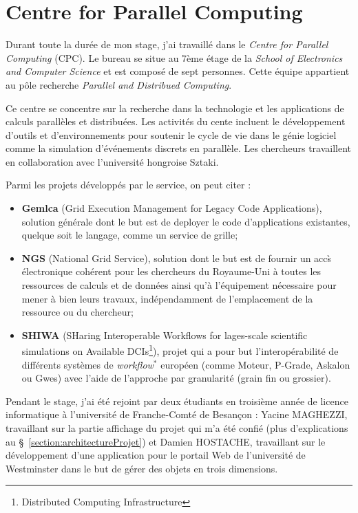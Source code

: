 \section{Centre for Parallel Computing}

Durant toute la dur\'ee de mon stage, j'ai travaill\'e dans le \textit{Centre for Parallel Computing} (CPC).
Le bureau se situe au 7\`eme \'etage de la \textit{School of Electronics and Computer Science} et est compos\'e de sept personnes.
Cette \'equipe appartient au p\^ole recherche \textit{Parallel and Distribued Computing}.

Ce centre se concentre sur la recherche dans la technologie et les applications de calculs parall\`eles et distribu\'ees.
Les activit\'es du cente incluent le d\'eveloppement d'outils et d'environnements pour soutenir le cycle de vie dans le g\'enie logiciel comme la simulation d'\'ev\'enements discrets en parall\`ele.
Les chercheurs travaillent en collaboration avec l'universit\'e hongroise Sztaki.

\noindent Parmi les projets d\'evelopp\'es par le service, on peut citer :

\begin{itemize}
	\item \textbf{Gemlca} (Grid Execution Management for Legacy Code Applications), solution g\'en\'erale dont le but est de deployer le code d'applications existantes, quelque soit le langage, comme un service de grille;
	\item \textbf{NGS} (National Grid Service), solution dont le but est de fournir un acc\`s \'electronique coh\'erent pour les chercheurs du Royaume-Uni \`a toutes les ressources de calculs et de donn\'ees ainsi qu'\`a l'\'equipement n\'ecessaire pour mener \`a bien leurs travaux, ind\'ependamment de l'emplacement de la ressource ou du chercheur;
	\item \textbf{SHIWA} (SHaring Interoperable Workflows for lages-scale scientific simulations on Available DCIs\protect\footnote{Distributed Computing Infrastructure}), projet qui a pour but l'interop\'erabilit\'e de diff\'erents syst\`emes de \textit{workflow}$^*$ europ\'een (comme Moteur, P-Grade, Askalon ou Gwes) avec l'aide de l'approche par granularit\'e (grain fin ou grossier).

\end{itemize}

\vspace{0.20cm}

Pendant le stage, j'ai \'et\'e rejoint par deux \'etudiants en troisi\`eme ann\'ee de licence informatique \`a l'universit\'e de Franche-Comt\'e de Besan\c{c}on : Yacine MAGHEZZI, travaillant sur la partie affichage du projet qui m'a \'et\'e confi\'e (plus d'explications au \S~\ref{section:architectureProjet}) et Damien HOSTACHE, travaillant sur le d\'eveloppement d'une application pour le portail Web de l'universit\'e de Westminster dans le but de g\'erer des objets en trois dimensions.


\clearpage
